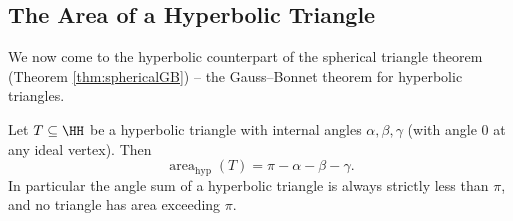 \subsection{The Area of a Hyperbolic Triangle}

We now come to the hyperbolic counterpart of the spherical triangle theorem (Theorem \ref{thm:sphericalGB}) -- the Gauss--Bonnet theorem for hyperbolic triangles.

\begin{theorem}\label{thm:hyperbolicGB}
    Let $T \subseteq \HH$ be a hyperbolic triangle with internal angles $\alpha, \beta, \gamma$ (with angle $0$ at any ideal vertex). Then
    $$
    \operatorname{area}_{\mathrm{hyp}}(T) = \pi - \alpha - \beta - \gamma.
    $$
    In particular the angle sum of a hyperbolic triangle is always strictly less than $\pi$, and no triangle has area exceeding $\pi$.
\end{theorem}
